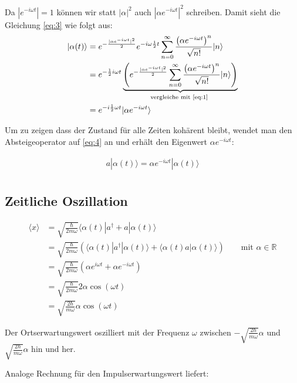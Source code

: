 Da \(|e^{-i\omega t}|=1\) können wir statt \(|\alpha|^2\) auch \(|\alpha e^{-i\omega t}|^2\) schreiben. Damit sieht die Gleichung \eqref{eq:3} wie folgt aus:
\begin{align}
  \label{eq:4}
   |\alpha (t)\rangle &= e^{-\frac{|\alpha e^{-i\omega t} |^2}{2}}e^{-i\omega\frac{1}{2}t}  \sum_{n=0}^{\infty} \frac{\left( \alpha e^{ -i\omega  t}\right)^n }{\sqrt{n!}}   |n\rangle\\
&=e^{-\frac{1}{2}i\omega t} \underbrace{\left(e^{-\frac{|\alpha e^{-i\omega t} |^2}{2}}  \sum_{n=0}^{\infty} \frac{\left( \alpha e^{ -i\omega  t}\right)^n }{\sqrt{n!}}   |n\rangle\right)}_{\text{vergleiche mit \eqref{eq:1} }}\\
&=e^{-i\frac{1}{2}\omega t}|\alpha e^{-i\omega t}\rangle
\end{align}


Um zu zeigen dass der Zustand für alle Zeiten kohärent bleibt, wendet man den Absteigeoperator auf \eqref{eq:4} an und erhält den Eigenwert \(\alpha e^{-i\omega t}\):

\begin{align}
  \label{eq:5}
  a |\alpha(t)\rangle = \alpha e^{-i\omega t} |\alpha(t)\rangle \\
\end{align}

\subsection*{Zeitliche Oszillation}


\begin{align}
  \label{eq:6}
  \langle x \rangle &=  \sqrt{ \frac{\hbar}{2 m\omega}}\langle \alpha(t) |a^\dagger + a|\alpha(t)\rangle \\
&=  \sqrt{ \frac{\hbar}{2 m\omega}}(\langle \alpha(t) |a^\dagger|\alpha(t)\rangle + \langle \alpha(t)a|\alpha(t)\rangle) \qquad \text{mit }\alpha\in \mathbb R\\
&=  \sqrt{ \frac{\hbar}{2 m\omega}}(\alpha e^{i\omega t} + \alpha e^{-i\omega t} )\\
&=  \sqrt{ \frac{\hbar}{2 m\omega}}2\alpha \cos(\omega t)\\
&=  \sqrt{ \frac{2\hbar}{ m\omega}}\alpha \cos(\omega t)
\end{align}


Der Ortserwartungswert oszilliert mit der Frequenz \(\omega\) zwischen \(- \sqrt{ \frac{2\hbar}{ m\omega}}\alpha\) und \(\sqrt{ \frac{2\hbar}{ m\omega}}\alpha\) hin und her.

Analoge Rechnung für den Impulserwartungswert liefert:

